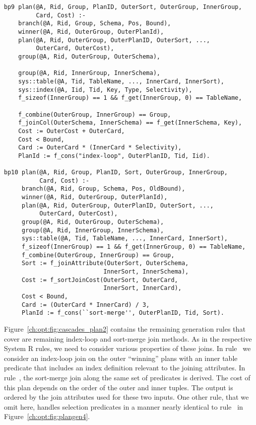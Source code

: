 \begin{figure*}
\ssp
\centering
\begin{lstlisting}
bp9 plan(@A, Rid, Group, PlanID, OuterSort, OuterGroup, InnerGroup, 
         Card, Cost) :-
    branch(@A, Rid, Group, Schema, Pos, Bound),
    winner(@A, Rid, OuterGroup, OuterPlanId),
    plan(@A, Rid, OuterGroup, OuterPlanID, OuterSort, ..., 
         OuterCard, OuterCost),
    group(@A, Rid, OuterGroup, OuterSchema),

    group(@A, Rid, InnerGroup, InnerSchema),
    sys::table(@A, Tid, TableName, ..., InnerCard, InnerSort),
    sys::index(@A, Iid, Tid, Key, Type, Selectivity),
    f_sizeof(InnerGroup) == 1 && f_get(InnerGroup, 0) == TableName,

    f_combine(OuterGroup, InnerGroup) == Group,
    f_joinCol(OuterSchema, InnerSchema) == f_get(InnerSchema, Key),
    Cost := OuterCost + OuterCard,
    Cost < Bound,
    Card := OuterCard * (InnerCard * Selectivity),
    PlanId := f_cons("index-loop", OuterPlanID, Tid, Iid).

bp10 plan(@A, Rid, Group, PlanID, Sort, OuterGroup, InnerGroup, 
          Card, Cost) :-
     branch(@A, Rid, Group, Schema, Pos, OldBound),
     winner(@A, Rid, OuterGroup, OuterPlanId),
     plan(@A, Rid, OuterGroup, OuterPlanID, OuterSort, ..., 
          OuterCard, OuterCost),
     group(@A, Rid, OuterGroup, OuterSchema),
     group(@A, Rid, InnerGroup, InnerSchema),
     sys::table(@A, Tid, TableName, ..., InnerCard, InnerSort),
     f_sizeof(InnerGroup) == 1 && f_get(InnerGroup, 0) == TableName,
     f_combine(OuterGroup, InnerGroup) == Group,
     Sort := f_joinAttribute(OuterSort, OuterSchema, 
                            InnerSort, InnerSchema),
     Cost := f_sortJoinCost(OuterSort, OuterCard, 
                            InnerSort, InnerCard),
     Cost < Bound,
     Card := (OuterCard * InnerCard) / 3,
     PlanId := f_cons(``sort-merge'', OuterPlanID, Tid, Sort).
\end{lstlisting}
\caption{\label{ch:opt:fig:cascades_plan2} Cascades plan generation rules for index-loop
and sort-merge join methods.}
\end{figure*}

Figure~\ref{ch:opt:fig:cascades_plan2} contains the remaining 
generation rules that cover are remaining index-loop and sort-merge join
methods.  As in the respective System R rules, we need to consider various
properties of these joins.  In rule~ we consider an index-loop join on
the outer ``winning'' plans with an inner table predicate that includes an
index definition relevant to the joining attributes.  In rule~, the
sort-merge join along the same set of predicates is derived.  The cost of this
plan depends on the order of the outer and inner tuples.  The output is ordered
by the join attributes used for these two inputs.  One other rule, that we omit
here, handles selection predicates in a manner nearly identical to rule~ 
in Figure~\ref{ch:opt:fig:plangen4}. 

